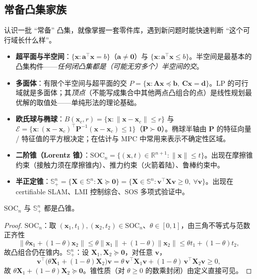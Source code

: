 \subsection{常备凸集家族}
\label{subsec:cvx-set-zoo}

认识一批 “常备” 凸集，就像掌握一套零件库，遇到新问题时能快速判断 “这个可行域长什么样”。

\begin{itemize}
  \item \textbf{超平面与半空间}：$\{\mathbf x:\mathbf a^\top\mathbf x=b\}$（$\mathbf a\neq\mathbf 0$）与 $\{\mathbf x:\mathbf a^\top\mathbf x\le b\}$。半空间是最基本的凸集构件——\emph{任何闭凸集都是（可能无穷多个）半空间的交}。
  \item \textbf{多面体}：有限个半空间与超平面的交 $P=\{\mathbf x:\mathbf A\mathbf x\preceq\mathbf b,\ \mathbf C\mathbf x=\mathbf d\}$。LP 的可行域就是多面体；其\emph{顶点}（不能写成集合中其他两点凸组合的点）是线性规划最优解的取值处——单纯形法的理论基础。
  \item \textbf{欧氏球与椭球}：$B(\mathbf x_c,r)=\{\mathbf x:\|\mathbf x-\mathbf x_c\|\le r\}$ 与 $\mathcal E=\{\mathbf x:(\mathbf x-\mathbf x_c)^\top\mathbf P^{-1}(\mathbf x-\mathbf x_c)\le1\}$（$\mathbf P\succ\mathbf 0$）。椭球半轴由 $\mathbf P$ 的特征向量 / 特征值的平方根决定；在估计与 MPC 中常用来表示不确定性区域。
  \item \textbf{二阶锥（Lorentz 锥）}：$\mathrm{SOC}_n=\{(\mathbf x,t)\in\mathbb{R}^{n+1}:\|\mathbf x\|\le t\}$。出现在摩擦锥约束（接触力须在摩擦锥内）、推力约束（火箭着陆）、鲁棒约束中。
  \item \textbf{半正定锥}：$\mathbb{S}^n_+=\{\mathbf X\in\mathbb{S}^n:\mathbf X\succeq\mathbf 0\}=\{\mathbf X\in\mathbb{S}^n:\mathbf v^\top\mathbf X\mathbf v\ge0,\ \forall\mathbf v\}$。出现在 certifiable SLAM、LMI 控制综合、SOS 多项式验证中。
\end{itemize}

\begin{proposition}[二阶锥与半正定锥的凸性]\label{prop:soc-psd-convex}
$\mathrm{SOC}_n$ 与 $\mathbb{S}^n_+$ 都是凸锥。
\end{proposition}
\begin{proof}
\emph{$\mathrm{SOC}_n$}：取 $(\mathbf x_1,t_1),(\mathbf x_2,t_2)\in\mathrm{SOC}_n$、$\theta\in[0,1]$，由三角不等式与范数正齐性
\[
  \|\theta\mathbf x_1+(1-\theta)\mathbf x_2\|\le\theta\|\mathbf x_1\|+(1-\theta)\|\mathbf x_2\|\le\theta t_1+(1-\theta)t_2,
\]
故凸组合仍在锥内。\emph{$\mathbb{S}^n_+$}：设 $\mathbf X_1,\mathbf X_2\succeq\mathbf 0$，对任意 $\mathbf v$，
\[
  \mathbf v^\top\!\big(\theta\mathbf X_1+(1-\theta)\mathbf X_2\big)\mathbf v=\theta\,\mathbf v^\top\mathbf X_1\mathbf v+(1-\theta)\,\mathbf v^\top\mathbf X_2\mathbf v\ge0,
\]
故 $\theta\mathbf X_1+(1-\theta)\mathbf X_2\succeq\mathbf 0$。锥性质（对 $\theta\ge0$ 的数乘封闭）由定义直接可见。
\end{proof}

